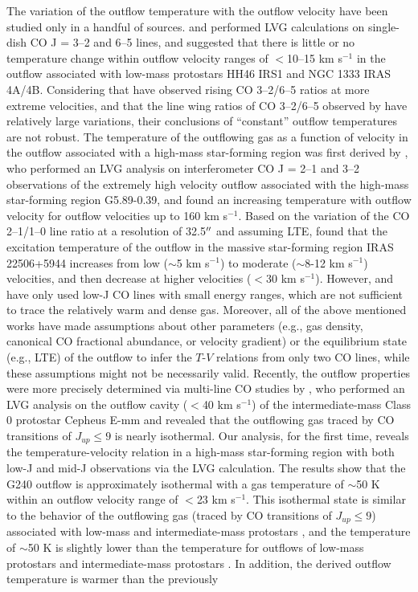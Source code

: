 The variation of the outflow temperature with the outflow velocity have been studied only in a handful of sources. \citet{2009A&A...501..633V} and \citet{2012A&A...542A..86Y} performed LVG calculations on single-dish CO J = 3--2 and 6--5 lines, and suggested that there is little or no temperature change within outflow velocity ranges of $<$10--15 km s$^{-1}$ in the outflow associated with low-mass protostars HH46 IRS1 and NGC 1333 IRAS 4A/4B. Considering that \citet{2009A&A...501..633V} have observed rising CO 3--2/6--5 ratios at more extreme velocities, and that the line wing ratios of CO 3--2/6--5 observed by \citet{2012A&A...542A..86Y} have relatively large variations, their conclusions of ``constant'' outflow temperatures are not robust. The temperature of the outflowing gas as a function of velocity in the outflow associated with a high-mass star-forming region was first derived by \citet{2012ApJ...744L..26S}, who performed an LVG analysis on interferometer CO J = 2--1 and 3--2 observations of the extremely high velocity outflow associated with the high-mass star-forming region G5.89-0.39, and found an increasing temperature with outflow velocity for outflow velocities up to 160 km s$^{-1}$. Based on the variation of the CO 2--1/1--0 line ratio at a resolution of 32.5$\mbox{$^{\prime\prime}$}$ and assuming LTE, \citet{2018RAA....18...19X} found that the excitation temperature of the outflow in the massive star-forming region IRAS 22506+5944 increases from low ($\sim$5 km s$^{-1}$) to moderate ($\sim$8-12 km s$^{-1}$) velocities, and then decrease at higher velocities ($<$30 km s$^{-1}$). However, \citet{2012ApJ...744L..26S} and \citet{2018RAA....18...19X} have only used low-J CO lines with small energy ranges, which are not sufficient to trace the relatively warm and dense gas. Moreover, all of the above mentioned works have made assumptions about other parameters (e.g., gas density, canonical CO fractional abundance, or velocity gradient) or the equilibrium state (e.g., LTE) of the outflow to infer the $T$-$V$ relations from only two CO lines, while these assumptions might not be necessarily valid. Recently, the outflow properties were more precisely determined via multi-line CO studies by \citet{2015A&A...581A...4L}, who performed an LVG analysis on the outflow cavity ($<$40 km s$^{-1}$) of the intermediate-mass Class 0 protostar Cepheus E-mm and revealed that the outflowing gas traced by CO transitions of $J_{up} \le 9$ is nearly isothermal. Our analysis, for the first time, reveals the temperature-velocity relation in a high-mass star-forming region with both low-J and mid-J observations via the LVG calculation. The results show that the G240 outflow is approximately isothermal with a gas temperature of $\sim$50 K within an outflow velocity range of $<$23 km s$^{-1}$. This isothermal state is similar to the behavior of the outflowing gas (traced by CO transitions of $J_{up} \le 9$) associated with low-mass and intermediate-mass protostars \citep{2012A&A...542A..86Y, 2015A&A...581A...4L}, and the temperature of $\sim$50 K is slightly lower than the temperature for outflows of low-mass protostars \citep{2009A&A...501..633V, 2012A&A...542A..86Y} and intermediate-mass protostars \citep{2016A&A...587A..17V}. In addition, the derived outflow temperature is warmer than the previously 